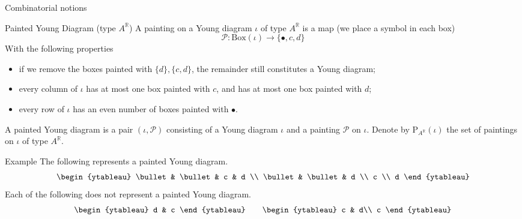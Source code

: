 \documentclass[fleqn,xcolor=dvipsnames]{beamer}
\newcommand{\BR}{{\mathbb {R}}}
\newcommand{\CP}{{\mathcal {P}}}
\begin{document}
\begin{frame}{Combinatorial notions}
  \begin{block}{Painted Young Diagram (type $A^{\BR}$)}
    A painting on a Young diagram $\iota$ of type $A^{\BR}$ is a map (we place a symbol in each box)
   $$\CP : \mathrm{Box}(\iota) \to \{ \bullet, c ,d \}$$
   With the following properties

   \begin{itemize}
      \item if we remove the boxes painted with $\{d\}, \{c,d\}$, the remainder still constitutes a Young diagram;
      \item every column of $\iota$ has at most one box painted with $c$, and has at most one box painted with $d$;
      \item every row of $\iota$ has an even number of boxes painted with $\bullet$.
   \end{itemize}
    A painted Young diagram is a pair $(\iota, \CP)$ consisting of a Young diagram $\iota$ and a painting $\CP$ on $\iota$. Denote by $\mathrm{P}_{A^{\BR}}(\iota)$ the set of paintings on $\iota$ of type $A^{\BR}$.
  \end{block}
  
\end{frame}

\begin{frame}
  \begin{block}{Example}
    The following represents a painted Young diagram.
    \[
    \begin{ytableau}
        \bullet & \bullet & c & d  \\
        \bullet & \bullet & d \\
        c \\
        d
    \end{ytableau}
    \]
     Each of the following does not represent a painted Young diagram.
    \[
    \begin{ytableau}
      d & c
    \end{ytableau}
    \qquad
    \begin{ytableau}
      c & d\\
      c
    \end{ytableau}
    \]
  \end{block}
  
\end{frame}
\end{document}
